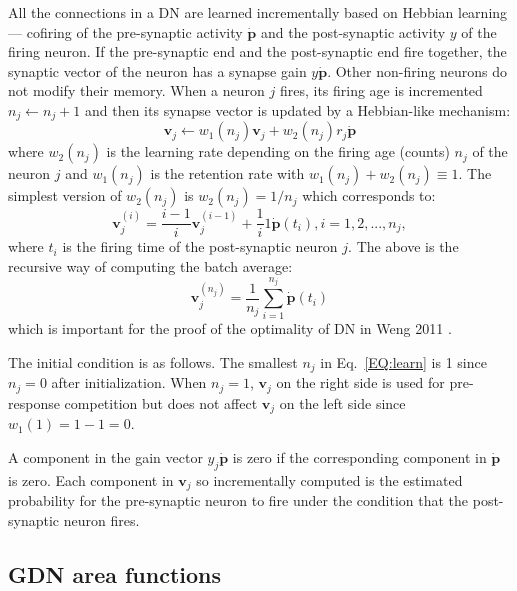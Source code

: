 \documentclass[conference]{IEEEtran}
\def\p{\mathbf p}
\def\v{\mathbf v}
\begin{document}
All the connections in a DN are learned incrementally 
based on Hebbian learning --- cofiring of the pre-synaptic activity $\dot{\p}$ and the
post-synaptic activity $y$ of the firing neuron.   If the pre-synaptic end and the post-synaptic
end fire together, the synaptic vector of the neuron has a synapse gain $y\dot{\p}$.  
Other non-firing neurons do not modify their memory.   
When a neuron $j$ fires, its firing age is incremented $n_j \leftarrow n_j+1$ and then
its synapse vector is updated by a Hebbian-like mechanism:  
\begin{equation}
\v_j \leftarrow w_1(n_j) \v_j + w_2(n_j) r_j \dot{\p}
\label{EQ:learn}
\end{equation}
where $w_2 (n_j)$ is the learning rate depending on the firing age (counts) $n_j $ of the neuron $j$ and $w_1(n_j)$ is the retention rate with $w_1(n_j) + w_2(n_j) \equiv 1$. 
The simplest version of $w_2(n_j)$ is $w_2(n_j) = 1/ n_j$ which corresponds to:
\begin{equation}
 \v_j ^{(i)} = \frac{i-1}{i} \v_j^{(i-1)} + \frac{1}{i} 1 \dot{\p}(t_{i}), i = 1, 2, ... , n_j, \nonumber
\end{equation}
 where $t_i$ is the firing time of the post-synaptic neuron $j$. 
The above is the recursive way of computing the batch average:
\begin{equation}
 \v_j ^{(n_j)} = \frac{1}{n_j} \sum_{i=1}^{n_j} \dot{\p}(t_i) \nonumber
\label{EQ:sum} 
 \end{equation}
 which is important for the proof of the optimality of DN in Weng 2011 \cite{Weng3ThmRpt11}.
 
 The initial condition is as follows.   The smallest $n_j$ in Eq.~\eqref{EQ:learn}
   is 1 since $n_j=0$ after initialization.  When $n_j=1$, $\v_j$ on the right side is used for pre-response 
competition but does not affect $\v_j$ on the left side since $w_1(1) = 1-1=0$.

A component in the gain vector $y_j \dot{\p}$ is zero if the corresponding component in $\dot{\p}$ is zero.  Each 
component in $\v_j$ so incrementally computed is the estimated probability for the pre-synaptic neuron  
to fire under the condition that the post-synaptic neuron fires.  

\subsection{GDN area functions}
\end{document}
